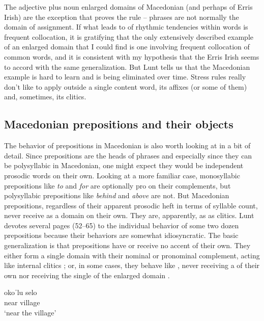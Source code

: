 \documentclass[output=paper,
modfonts
]{LSP/langsci}
\begin{document}
\begin{exe}
The adjective plus noun enlarged domains of Macedonian (and perhaps of Erris Irish) are the exception that proves the rule -- phrases are not normally the domain of  assignment. If what leads to  of rhythmic tendencies within words is frequent collocation, it is gratifying that the only extensively described example of an enlarged domain that I could find is one involving frequent collocation of common words, and it is consistent with my hypothesis that the Erris Irish seems to accord with the same generalization. But Lunt tells us that the Macedonian example is hard to learn and is being eliminated over time. Stress rules really don’t like to apply outside a single content word, its affixes (or some of them) and, sometimes, its clitics. 

\subsection[Macedonian prepositions and their objects]{Macedonian prepositions and their objects}\label{sec:kaisse:4.4}

The  behavior of prepositions in Macedonian is also worth looking at in a bit of detail. Since prepositions are the heads of phrases and especially since they can be polysyllabic in Macedonian, one might expect they would be independent prosodic words on their own. Looking at a more familiar case,  monosyllabic prepositions like \textit{to} and\textit{ for} are optionally pro on their complements, but polysyllabic prepositions like \textit{behind} and \textit{above} are not. But Macedonian prepositions, regardless of their apparent prosodic heft in terms of syllable count, never receive  as a domain on their own. They are, apparently, as  as clitics. Lunt devotes several pages (52--65) to the individual behavior of some two dozen prepositions because their  behaviors are somewhat idiosyncratic. The basic generalization is that prepositions have or receive no accent of their own. They either form a single  domain with their nominal or pronominal complement, acting like internal clitics ; or, in some cases, they behave like , never receiving a  of their own nor receiving the single  of the enlarged domain . 

\ea \label{ex:kaisse:20}  \citep{franks1989}
	\ea \label{ex:kaisse:20a} \gll okoˈlu selo\\
	near village\\
	\glt  `near the village'


\end{exe}
\end{document}

